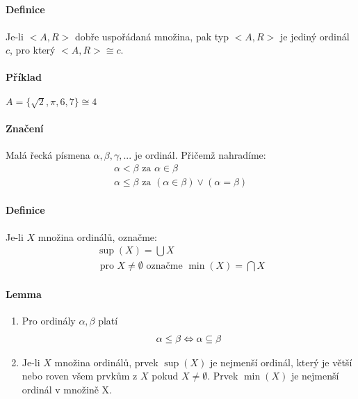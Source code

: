 \documentclass[a4paper,12pt,titlepage]{article}
\begin{document}
\subsection{}
\setcounter{equation}{0}
\paragraph{Definice}
Je-li $<A, R>$ dobře uspořádaná množina, pak typ $<A, R>$ je jediný ordinál $c$, pro
který $<A, R> \cong c$. 
\paragraph{Příklad}
$A = \{ \sqrt{2}, \pi, 6, 7\} \cong 4$
\paragraph{Značení} Malá řecká písmena $\alpha, \beta, \gamma, ...$ je ordinál.
Přičemž nahradíme:
\begin{align}
	\alpha < \beta \text{ za } \alpha \in \beta \\
	\alpha \le \beta \text{ za } (\alpha \in \beta) \lor (\alpha = \beta)
\end{align}
\paragraph{Definice}
Je-li $X$ množina ordinálů, označme:
\begin{align}
	\sup(X) = \bigcup X \\
	\text{ pro } X \neq \emptyset \text{ označme } \min(X) = \bigcap X
\end{align}
\paragraph{Lemma}
\begin{enumerate}
	\item 
	Pro ordinály $\alpha, \beta$ platí
	\begin{align}
		\alpha \le \beta \Leftrightarrow \alpha \subseteq \beta
	\end{align}
	\item 
	Je-li $X$ množina ordinálů, prvek $\sup(X)$ je nejmenší ordinál, který je
	větší nebo roven všem prvkům z $X$ pokud $X \neq \emptyset$. Prvek $\min(X)$
	je nejmenší ordinál v množině X.
\end{enumerate}
\end{document}
